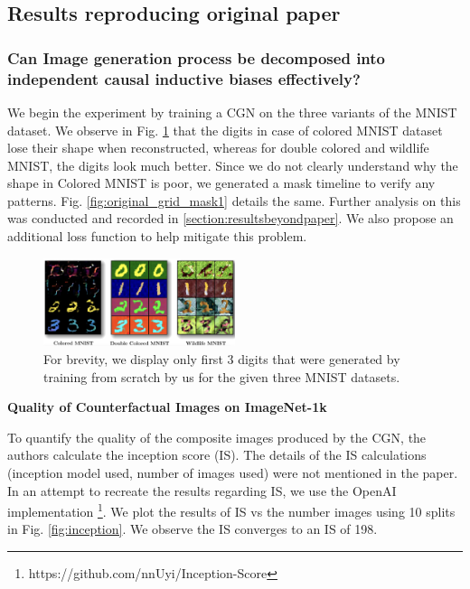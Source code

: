 \subsection{Results reproducing original paper}


\subsubsection{Can Image generation process be decomposed into independent causal inductive biases effectively?}

We begin the experiment by training a CGN on the three variants of the MNIST dataset. We observe in Fig. \ref{fig:original_counterfactuals_mnist} that the digits in case of colored MNIST dataset lose their shape when reconstructed, whereas for double colored and wildlife MNIST, the digits look much better. Since we do not clearly understand why the shape in Colored MNIST is poor, we generated a mask timeline to verify any patterns. Fig. \ref{fig:original_grid_mask1} details the same. Further analysis on this was conducted and recorded in \ref{section:resultsbeyondpaper}. We also propose an additional loss function to help mitigate this problem.

\begin{figure}[ht!]
  \vspace{-5mm}
  \centering
    \includegraphics[width=0.5\textwidth,height=0.3\textwidth]{../openreview/images/mnist_cfgs/mnist_cfg.png}
    \caption{For brevity, we display only first 3 digits that were generated by training from scratch by us for the given three MNIST datasets.  
    }
    \label{fig:original_counterfactuals_mnist}
\end{figure}


\textbf{Quality of Counterfactual Images on ImageNet-1k}


To quantify the quality of the composite images produced by the CGN, the authors calculate the inception score (IS). The details of the IS calculations (inception model used, number of images used) were not mentioned in the paper. In an attempt to recreate the results regarding IS, we use the OpenAI implementation \footnote{https://github.com/nnUyi/Inception-Score}. We plot the results of IS vs the number images using 10 splits in Fig. \ref{fig:inception}. We observe the IS converges to an IS of 198.



